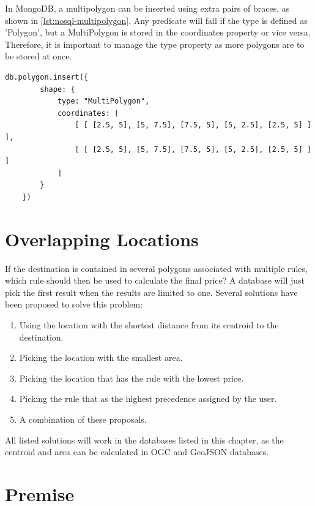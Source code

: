 In MongoDB, a multipolygon can be inserted using extra pairs of braces, as shown in \ref{lst:nosql-multipolygon}. Any predicate will fail if the type is defined as 'Polygon', but a MultiPolygon is stored in the coordinates property or vice versa. Therefore, it is important to manage the type property as more polygons are to be stored at once.

\begin{lstlisting}[caption={Insert one multipolygon in MongoDB.}, label={lst:nosql-multipolygon}]
	db.polygon.insert({
		shape: {
			type: "MultiPolygon",
			coordinates: [
				[ [ [2.5, 5], [5, 7.5], [7.5, 5], [5, 2.5], [2.5, 5] ] ],
				[ [ [2.5, 5], [5, 7.5], [7.5, 5], [5, 2.5], [2.5, 5] ] ]
			]
		}
	})
\end{lstlisting}

\section{Overlapping Locations}
If the destination is contained in several polygons associated with multiple rules, which rule should then be used to calculate the final price? A database will just pick the first result when the results are limited to one. Several solutions have been proposed to solve this problem:

\begin{enumerate}
	\item Using the location with the shortest distance from its centroid to the destination.
	\item Picking the location with the smallest area.
	\item Picking the location that has the rule with the lowest price.
	\item Picking the rule that as the highest precedence assigned by the user.
	\item A combination of these proposals.
\end{enumerate}

All listed solutions will work in the databases listed in this chapter, as the centroid and area can be calculated in OGC and GeoJSON databases.

%
\section{Premise}

